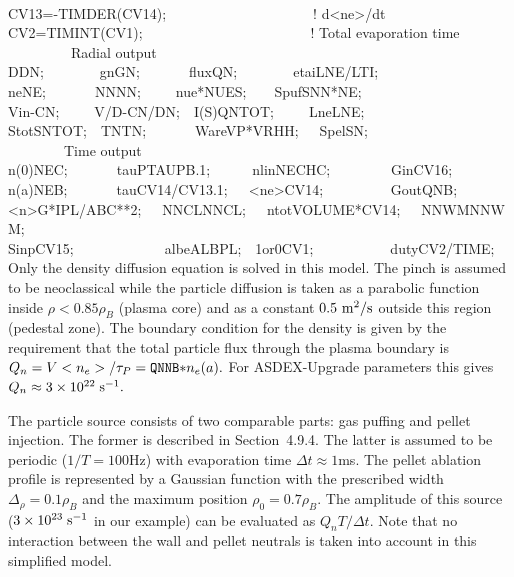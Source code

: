 {\\ \hspace*{1mm}
CV13=-TIMDER(CV14);~~~~~~~~~~~~~~~~~~~~~! d<ne>/dt
\\ \hspace*{1mm}
CV2=TIMINT(CV1);~~~~~~~~~~~~~~~~~~~~~~~~! Total evaporation time
\smallskip\\ \hspace*{1mm}
~~~~~~~~~Radial output
\\ \hspace*{1mm}
D\bs DN;~~~~~~~~gn\bs GN;~~~~~~~flux\bs QN;~~~~~~~~etai\bs LNE/LTI;
\\ \hspace*{1mm}
ne\bs NE;~~~~~~~NN\bs NN;~~~~~nue*\bs NUES;~~~~Spuf\bs SNN*NE;
\\ \hspace*{1mm}
Vin\bs -CN;~~~~~V/D\bs -CN/DN;~~I(S)\bs QNTOT;~~~~~Lne\bs LNE;
\\ \hspace*{1mm}
Stot\bs SNTOT;~~TN\bs TN;~~~~~~~Ware\bs VP*VRHH;~~~Spel\bs SN;
\smallskip\\ \hspace*{1mm}
~~~~~~~~Time output
\\ \hspace*{1mm}
n(0)\us NEC;~~~~~~~tauP\us TAUPB\us .1;~~~~~~nlin\us NECHC;
						~~~~~~~~Gin\us CV16;
\\ \hspace*{1mm}
n(a)\us NEB;~~~~~~~tau\us CV14/CV13\us .1;~~~<ne>\us CV14;
						~~~~~~~~~Gout\us QNB;
\\ \hspace*{1mm}
<n>G*IPL/ABC**2;~~~NNCL\us NNCL;~~~ntot\us VOLUME*CV14;~~~NNWM\us NNWM;
\\ \hspace*{1mm}
Sinp\us CV15;~~~~~~~~~~~~~albe\us ALBPL;~~1or0\us CV1;~~~~~~~~~~~duty\us CV2/TIME;
\medskip\\}
Only the density diffusion equation is solved in this model.
The pinch is assumed to be neoclassical while the particle diffusion is
taken as a parabolic function inside $\rho<0.85\rho_B$ (plasma core) and
as a constant $\rm 0.5~m^2/s$ outside this region (pedestal zone).
The boundary condition for the density is given by the requirement that
the total particle flux through the plasma boundary is
$Q_n=V<n_e>/\tau_P={\tt QNNB*}n_e(a).$
For ASDEX-Upgrade parameters this gives 
$Q_n\approx 3\times 10^{22}\rm\;s^{-1}.$

The particle source consists of two comparable parts: gas puffing and
pellet injection. 
The former is described in Section~4.9.4. 
The latter is assumed to be periodic ($1/T=100$Hz) with evaporation time
$\Delta t\approx 1$ms. 
The pellet ablation profile is represented by a Gaussian function with
the prescribed width $\Delta_\rho=0.1\rho_B$ and the maximum position 
$\rho_0=0.7\rho_B$. 
The amplitude of this source ($3\times 10^{23}\rm\;s^{-1}$ in our example) can be evaluated as 
$Q_nT/\Delta t.$
Note that no interaction between the wall and pellet neutrals is taken
into account in this simplified model.

